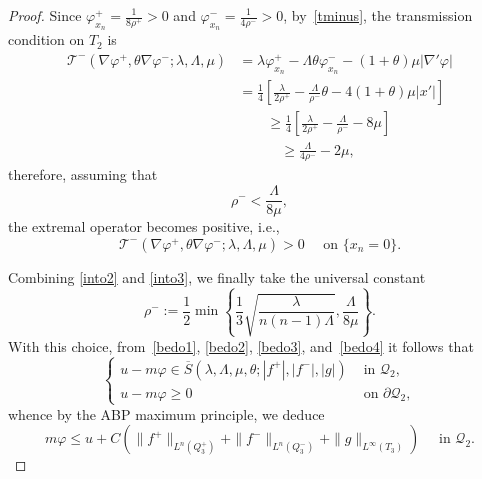 \documentclass[letter,11pt]{amsart}
\newcommand{\gcal}{\mathcal{Q}}
\newcommand{\tcal}{\mathcal{T}}
\theoremstyle{definition}
\numberwithin{equation}{section}
\begin{document}
\begin{proof}
Since $\varphi_{x_n}^{+} = \frac{1}{8 \rho^{+}} >0$ and $\varphi_{x_n}^{-} = \frac{1}{4 \rho^{-}} >0$,  by~\eqref{tminus}, the transmission condition on $T_{2}$ is
\[
\begin{split}
\tcal^{-}(\nabla \varphi^{+},\theta \nabla \varphi^{-}; \lambda, \Lambda, \mu) 
& = \lambda \varphi_{x_n}^{+} - \Lambda \theta \varphi_{x_n}^{-} - (1+ \theta) \mu |\nabla' \varphi|\\
&= \frac{1}{4} \left[
\frac{\lambda}{2\rho^{+}}
- \frac{\Lambda}{\rho^{-}} \theta - 4(1+ \theta)\mu |x'|
\right]\\
& \qquad \geq \frac{1}{4} \left[
\frac{\lambda}{2\rho^{+}}
- \frac{\Lambda}{\rho^{-}} - 8 \mu
\right]\\
& \qquad \quad \geq \frac{\Lambda}{4 \rho^{-}}- 2 \mu,
\end{split}
\]
therefore, assuming that
\begin{equation}
\label{into3}
\rho^{-} 
< \frac{\Lambda}{8 \mu},
\end{equation}
the extremal operator becomes positive, i.e.,
\begin{equation}
\label{bedo4}
\tcal^{-}(\nabla \varphi^{+},\theta \nabla \varphi^{-};\lambda, \Lambda, \mu)  > 0 \quad \text{ on } \{x_n = 0\}.
\end{equation}

\medskip

Combining \eqref{into2} and \eqref{into3}, we finally take the universal constant
\[
\rho^{-} := \frac{1}{2} \min\left\{
\frac{1}{3} \sqrt{\frac{\lambda}{n(n-1)\Lambda}},
\frac{\Lambda}{8 \mu}
\right\}.
\]
With this choice, from~\eqref{bedo1}, \eqref{bedo2}, \eqref{bedo3}, and~\eqref{bedo4} it follows that
\[
\begin{cases}
u - m \varphi \in \overline{S}(\lambda,\Lambda,\mu,\theta; |f^{+}|, |f^{-}|, |g|) & \text{ in } \gcal_2,\\
u - m \varphi \geq 0 & \text{ on } \partial \gcal_2,
\end{cases}
\]
whence by the ABP maximum principle, we deduce
\begin{equation}
\label{bedo5}
m \varphi \leq u + 
C\left( 
\|f^{+}\|_{L^n(Q^{+}_3)} + \|f^{-}\|_{L^n(Q^{-}_3)}
+ \|g\|_{L^{\infty}(T_3)} \right) 
\quad \text{ in } \gcal_2.
\end{equation}

\medskip


\end{proof}
\end{document}
